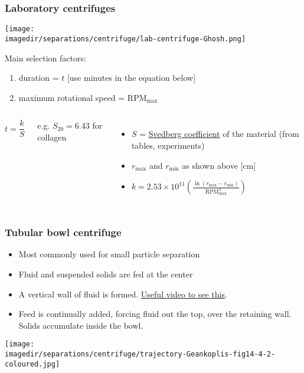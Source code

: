 \begin{frame}\frametitle{Laboratory centrifuges}

	\begin{center}
		\texttt{[image: \\imagedir/separations/centrifuge/lab-centrifuge-Ghosh.png]}
	\end{center}
	\vspace{-12pt}
	Main selection factors:
	\begin{enumerate}
		\item	duration = $t$ [use minutes in the equation below]
		\item	maximum rotational speed = $\text{RPM}_\text{max}$ 	%
	\end{enumerate}
	\vspace{-12pt}
	\begin{columns}[t]
			\[
				t = \displaystyle \frac{k}{S}
			\]

			\vspace{24pt}
			{\small e.g. $S_{20} = 6.43$ for collagen}
			\begin{itemize}
				\item	$S$ = \href{http://en.wikipedia.org/wiki/Svedberg}{Svedberg coefficient} of the material (from tables, experiments)
				\item	$r_\text{max}$ and $r_\text{min}$ as shown above [cm]
				\item	$k = 2.53 \times 10^{11} \left(\displaystyle \frac{\ln\left( r_\text{max} -r_\text{min} \right)}{\text{RPM}_\text{max}^2} \right)$
			\end{itemize}
	\end{columns}
\end{frame}

\begin{frame}\frametitle{Tubular bowl centrifuge}
	\begin{itemize}
		\item	Most commonly used for small particle separation
		\item	Fluid and suspended solids are fed at the center
		\item	A vertical wall of fluid is formed. \href{http://composite-video-cUhgKFV5Ri4}{Useful video to see this}.
		\item	Feed is continually added, forcing fluid out the top, over the retaining wall. Solids accumulate inside the bowl.
	\end{itemize}
	\begin{center}
		\texttt{[image: \\imagedir/separations/centrifuge/trajectory-Geankoplis-fig14-4-2-coloured.jpg]}
	\end{center}
	\vspace{-24pt}	
\end{frame}

